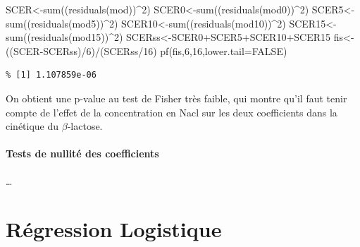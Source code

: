\documentclass[
]{article}
\newenvironment{Shaded}{\begin{snugshade}}{\end{snugshade}}
\newcommand{\AttributeTok}[1]{\textcolor[rgb]{0.77,0.63,0.00}{#1}}
\newcommand{\ConstantTok}[1]{\textcolor[rgb]{0.00,0.00,0.00}{#1}}
\newcommand{\DecValTok}[1]{\textcolor[rgb]{0.00,0.00,0.81}{#1}}
\newcommand{\FunctionTok}[1]{\textcolor[rgb]{0.00,0.00,0.00}{#1}}
\newcommand{\NormalTok}[1]{#1}
\newcommand{\OtherTok}[1]{\textcolor[rgb]{0.56,0.35,0.01}{#1}}
\newcommand{\SpecialCharTok}[1]{\textcolor[rgb]{0.00,0.00,0.00}{#1}}
\begin{document}
\begin{Shaded}
\begin{Highlighting}[]
\NormalTok{SCER}\OtherTok{\textless{}{-}}\FunctionTok{sum}\NormalTok{((}\FunctionTok{residuals}\NormalTok{(mod))}\SpecialCharTok{\^{}}\DecValTok{2}\NormalTok{)}
\NormalTok{SCER0}\OtherTok{\textless{}{-}}\FunctionTok{sum}\NormalTok{((}\FunctionTok{residuals}\NormalTok{(mod0))}\SpecialCharTok{\^{}}\DecValTok{2}\NormalTok{)}
\NormalTok{SCER5}\OtherTok{\textless{}{-}}\FunctionTok{sum}\NormalTok{((}\FunctionTok{residuals}\NormalTok{(mod5))}\SpecialCharTok{\^{}}\DecValTok{2}\NormalTok{)}
\NormalTok{SCER10}\OtherTok{\textless{}{-}}\FunctionTok{sum}\NormalTok{((}\FunctionTok{residuals}\NormalTok{(mod10))}\SpecialCharTok{\^{}}\DecValTok{2}\NormalTok{)}
\NormalTok{SCER15}\OtherTok{\textless{}{-}}\FunctionTok{sum}\NormalTok{((}\FunctionTok{residuals}\NormalTok{(mod15))}\SpecialCharTok{\^{}}\DecValTok{2}\NormalTok{)}
\NormalTok{SCERss}\OtherTok{\textless{}{-}}\NormalTok{SCER0}\SpecialCharTok{+}\NormalTok{SCER5}\SpecialCharTok{+}\NormalTok{SCER10}\SpecialCharTok{+}\NormalTok{SCER15}
\NormalTok{fis}\OtherTok{\textless{}{-}}\NormalTok{((SCER}\SpecialCharTok{{-}}\NormalTok{SCERss)}\SpecialCharTok{/}\DecValTok{6}\NormalTok{)}\SpecialCharTok{/}\NormalTok{(SCERss}\SpecialCharTok{/}\DecValTok{16}\NormalTok{) }
\FunctionTok{pf}\NormalTok{(fis,}\DecValTok{6}\NormalTok{,}\DecValTok{16}\NormalTok{,}\AttributeTok{lower.tail=}\ConstantTok{FALSE}\NormalTok{)}
\end{Highlighting}
\end{Shaded}

\begin{verbatim}
% [1] 1.107859e-06
\end{verbatim}

On obtient une p-value au test de Fisher très faible, qui montre qu'il
faut tenir compte de l'effet de la concentration en Nacl sur les deux
coefficients dans la cinétique du \(\beta\)-lactose.

\hypertarget{tests-de-nullituxe9-des-coefficients}{%
\paragraph{Tests de nullité des
coefficients}\label{tests-de-nullituxe9-des-coefficients}}

\ldots{}

\hypertarget{ruxe9gression-logistique}{%
\section{Régression Logistique}\label{ruxe9gression-logistique}}
\end{document}
